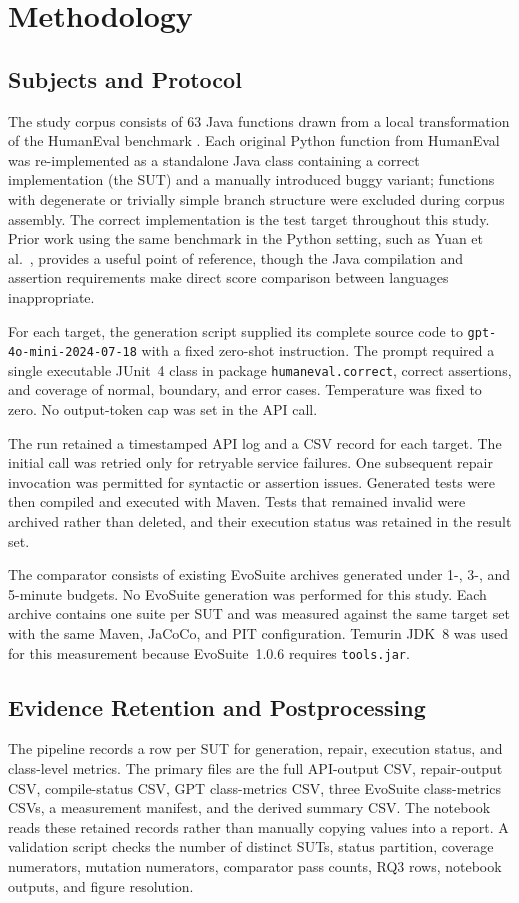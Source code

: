\section{Methodology}
\label{sec:method}

\subsection{Subjects and Protocol}
The study corpus consists of 63 Java functions drawn from a local transformation of the HumanEval benchmark \cite{chen2021codex}. Each original Python function from HumanEval was re-implemented as a standalone Java class containing a correct implementation (the SUT) and a manually introduced buggy variant; functions with degenerate or trivially simple branch structure were excluded during corpus assembly. The correct implementation is the test target throughout this study. Prior work using the same benchmark in the Python setting, such as Yuan et al.\ \cite{yuan2024junit}, provides a useful point of reference, though the Java compilation and assertion requirements make direct score comparison between languages inappropriate.

For each target, the generation script supplied its complete source code to \texttt{gpt-4o-mini-2024-07-18} with a fixed zero-shot instruction. The prompt required a single executable JUnit~4 class in package \texttt{humaneval.correct}, correct assertions, and coverage of normal, boundary, and error cases. Temperature was fixed to zero. No output-token cap was set in the API call.

The run retained a timestamped API log and a CSV record for each target. The initial call was retried only for retryable service failures. One subsequent repair invocation was permitted for syntactic or assertion issues. Generated tests were then compiled and executed with Maven. Tests that remained invalid were archived rather than deleted, and their execution status was retained in the result set.

The comparator consists of existing EvoSuite archives generated under 1-, 3-, and 5-minute budgets. No EvoSuite generation was performed for this study. Each archive contains one suite per SUT and was measured against the same target set with the same Maven, JaCoCo, and PIT configuration. Temurin JDK~8 was used for this measurement because EvoSuite~1.0.6 requires \texttt{tools.jar}.

\subsection{Evidence Retention and Postprocessing}
The pipeline records a row per SUT for generation, repair, execution status, and class-level metrics. The primary files are the full API-output CSV, repair-output CSV, compile-status CSV, GPT class-metrics CSV, three EvoSuite class-metrics CSVs, a measurement manifest, and the derived summary CSV. The notebook reads these retained records rather than manually copying values into a report. A validation script checks the number of distinct SUTs, status partition, coverage numerators, mutation numerators, comparator pass counts, RQ3 rows, notebook outputs, and figure resolution.

